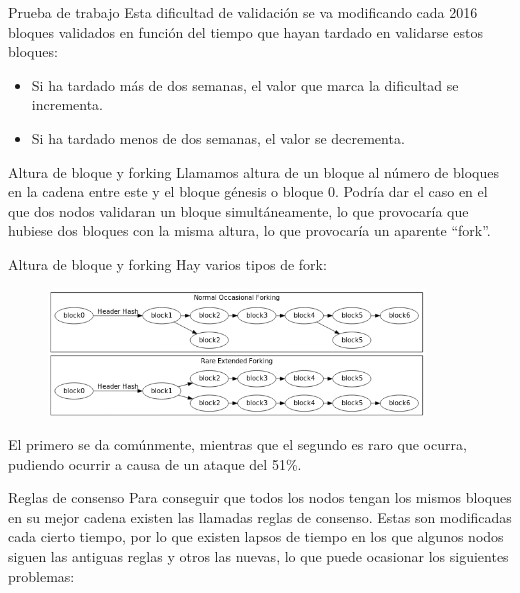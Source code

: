 \documentclass[compress,brown,xcolor=table]{beamer}
\begin{document}
\begin{frame}{Prueba de trabajo}
	Esta dificultad de validación se va modificando cada 2016 bloques validados en función del tiempo que hayan tardado en validarse estos bloques:
	\begin{itemize}
	\item Si ha tardado más de dos semanas, el valor que marca la dificultad se incrementa.
	\item Si ha tardado menos de dos semanas, el valor se decrementa.
\end{itemize}	
\end{frame}

\begin{frame}{Altura de bloque y forking}
	Llamamos altura de un bloque al número de bloques en la cadena entre este y el bloque génesis o bloque 0. Podría dar el caso en el que dos nodos validaran un bloque simultáneamente, lo que provocaría que hubiese dos bloques con la misma altura, lo que provocaría un aparente ``fork''.
\end{frame}

\begin{frame}{Altura de bloque y forking}
	Hay varios tipos de fork:
	\begin{figure}[h]
	\includegraphics[width=10cm]{../images/forkingtypes.png}
	\centering		
	\label{p3}
	\end{figure}
El primero se da comúnmente, mientras que el segundo es raro que ocurra, pudiendo ocurrir a causa de un ataque del 51\%.
	
\end{frame}

\begin{frame}{Reglas de consenso}
	Para conseguir que todos los nodos tengan los mismos bloques en su mejor cadena existen las llamadas reglas de consenso. Estas son modificadas cada cierto tiempo, por lo que existen lapsos de tiempo en los que algunos nodos siguen las antiguas reglas y otros las nuevas, lo que puede ocasionar los siguientes problemas:
	
\end{frame}
\end{document}
